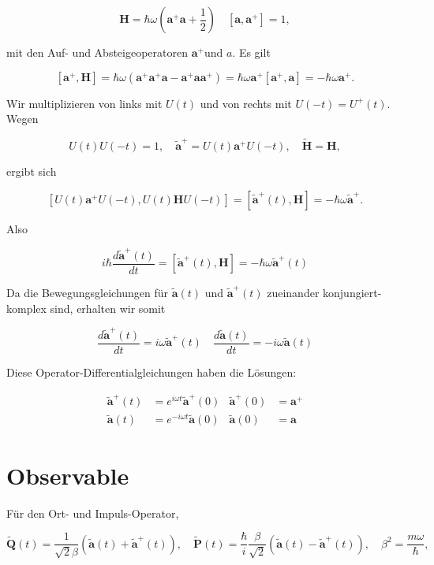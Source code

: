 \documentclass[10pt, letterpaper]{article}
\begin{document}
$$
\mathbf{H}=\hbar \omega\left(\mathbf{a}^{+} \mathbf{a}+\frac{1}{2}\right) \quad\left[\mathbf{a}, \mathbf{a}^{+}\right]=1,
$$

mit den Auf- und Absteigeoperatoren $\mathbf{a}^{+}$und $a$. Es gilt

$$
\left[\mathbf{a}^{+}, \mathbf{H}\right]=\hbar \omega\left(\mathbf{a}^{+} \mathbf{a}^{+} \mathbf{a}-\mathbf{a}^{+} \mathbf{a a}^{+}\right)=\hbar \omega \mathbf{a}^{+}\left[\mathbf{a}^{+}, \mathbf{a}\right]=-\hbar \omega \mathbf{a}^{+} .
$$

Wir multiplizieren von links mit $U(t)$ und von rechts mit $U(-t)=U^{+}(t)$. Wegen

$$
U(t) U(-t)=1, \quad \tilde{\mathbf{a}}^{+}=U(t) \mathbf{a}^{+} U(-t), \quad \tilde{\mathbf{H}}=\mathbf{H},
$$

ergibt sich

$$
\left[U(t) \mathbf{a}^{+} U(-t), U(t) \mathbf{H} U(-t)\right]=\left[\tilde{\mathbf{a}}^{+}(t), \mathbf{H}\right]=-\hbar \omega \tilde{\mathbf{a}}^{+} .
$$

Also

$$
i \hbar \frac{d \tilde{\mathbf{a}}^{+}(t)}{d t}=\left[\tilde{\mathbf{a}}^{+}(t), \mathbf{H}\right]=-\hbar \omega \tilde{\mathbf{a}}^{+}(t)
$$

Da die Bewegungsgleichungen für $\tilde{\mathbf{a}}(t)$ und $\tilde{\mathbf{a}}^{+}(t)$ zueinander konjungiert-komplex sind, erhalten wir somit

$$
\frac{d \tilde{\mathbf{a}}^{+}(t)}{d t}=i \omega \tilde{\mathbf{a}}^{+}(t) \quad \frac{d \tilde{\mathbf{a}}(t)}{d t}=-i \omega \tilde{\mathbf{a}}(t)
$$

Diese Operator-Differentialgleichungen haben die Lösungen:

$$
\begin{aligned}
\tilde{\mathbf{a}}^{+}(t) & =e^{i \omega t} \tilde{\mathbf{a}}^{+}(0) & \tilde{\mathbf{a}}^{+}(0) & =\mathbf{a}^{+} \\
\tilde{\mathbf{a}}(t) & =e^{-i \omega t} \tilde{\mathbf{a}}(0) & \tilde{\mathbf{a}}(0) & =\mathbf{a}
\end{aligned}
$$

\section*{Observable}
Für den Ort- und Impuls-Operator,

$$
\tilde{\mathbf{Q}}(t)=\frac{1}{\sqrt{2} \beta}\left(\tilde{\mathbf{a}}(t)+\tilde{\mathbf{a}}^{+}(t)\right), \quad \tilde{\mathbf{P}}(t)=\frac{\hbar}{i} \frac{\beta}{\sqrt{2}}\left(\tilde{\mathbf{a}}(t)-\tilde{\mathbf{a}}^{+}(t)\right), \quad \beta^{2}=\frac{m \omega}{\hbar},
$$
\end{document}
